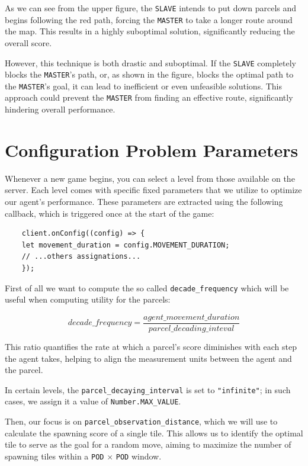 \documentclass[10pt]{article}
\begin{document}
As we can see from the upper figure, the \texttt{SLAVE} intends to put down parcels and begins following the red path, forcing the \texttt{MASTER} to take a longer route around the map. This results in a highly suboptimal solution, significantly reducing the overall score.

However, this technique is both drastic and suboptimal. If the \texttt{SLAVE} completely blocks the \texttt{MASTER}'s path, or, as shown in the figure, blocks the optimal path to the \texttt{MASTER}'s goal, it can lead to inefficient or even unfeasible solutions. This approach could prevent the \texttt{MASTER} from finding an effective route, significantly hindering overall performance.


\section{Configuration Problem Parameters}

\label{config_params}

Whenever a new game begins, you can select a level from those available on the server. Each level comes with specific fixed parameters that we utilize to optimize our agent's performance. These parameters are extracted using the following callback, which is triggered once at the start of the game:

\begin{verbatim}
    client.onConfig((config) => {
    let movement_duration = config.MOVEMENT_DURATION;
    // ...others assignations...
    });
\end{verbatim}

First of all we want to compute the so called \texttt{decade\_frequency} which will be useful when computing utility for the parcels: 

\begin{equation}
    decade\_frequency = \frac{agent\_movement\_duration}{parcel\_decading\_inteval}
\end{equation}

This ratio quantifies the rate at which a parcel's score diminishes with each step the agent takes, helping to align the measurement units between the agent and the parcel.

In certain levels, the \texttt{parcel\_decaying\_interval} is set to \texttt{"infinite"}; in such cases, we assign it a value of \texttt{Number.MAX\_VALUE}.

Then, our focus is on \texttt{parcel\_observation\_distance}, which we will use to calculate the spawning score of a single tile. This allows us to identify the optimal tile to serve as the goal for a random move, aiming to maximize the number of spawning tiles within a \texttt{POD} $\times$ \texttt{POD} window.
\end{document}
